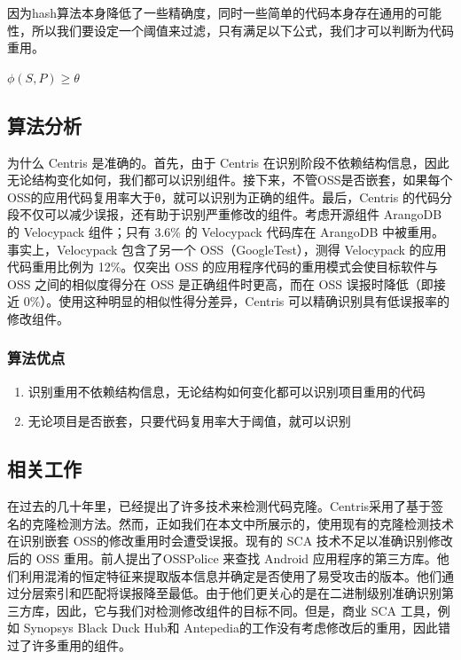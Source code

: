 \documentclass{cjc}
\begin{document}
因为hash算法本身降低了一些精确度，同时一些简单的代码本身存在通用的可能性，所以我们要设定一个阈值来过滤，只有满足以下公式，我们才可以判断为代码重用。



$\phi(S, P) \geq \theta$



\subsection{算法分析}
为什么 Centris 是准确的。首先，由于 Centris 在识别阶段不依赖结构信息，因此无论结构变化如何，我们都可以识别组件。接下来，不管OSS是否嵌套，如果每个OSS的应用代码复用率大于θ，就可以识别为正确的组件。最后，Centris 的代码分段不仅可以减少误报，还有助于识别严重修改的组件。考虑开源组件 ArangoDB 的 Velocypack 组件；只有 3.6\% 的 Velocypack 代码库在 ArangoDB 中被重用。事实上，Velocypack 包含了另一个 OSS（GoogleTest），测得 Velocypack 的应用代码重用比例为 12\%。仅突出 OSS 的应用程序代码的重用模式会使目标软件与 OSS 之间的相似度得分在 OSS 是正确组件时更高，而在 OSS 误报时降低（即接近 0\%）。使用这种明显的相似性得分差异，Centris 可以精确识别具有低误报率的修改组件。
\\
\subsubsection{算法优点}

\begin{enumerate}
    \item 识别重用不依赖结构信息，无论结构如何变化都可以识别项目重用的代码
    \item 无论项目是否嵌套，只要代码复用率大于阈值，就可以识别
\end{enumerate}

\subsection{相关工作}
在过去的几十年里，已经提出了许多技术来检测代码克隆。Centris采用了基于签名的克隆检测方法。然而，正如我们在本文中所展示的，使用现有的克隆检测技术在识别嵌套 OSS的修改重用时会遭受误报。现有的 SCA 技术不足以准确识别修改后的 OSS 重用。前人提出了OSSPolice 来查找 Android 应用程序的第三方库。他们利用混淆的恒定特征来提取版本信息并确定是否使用了易受攻击的版本。他们通过分层索引和匹配将误报降至最低。由于他们更关心的是在二进制级别准确识别第三方库，因此，它与我们对检测修改组件的目标不同。但是，商业 SCA 工具，例如 Synopsys Black Duck Hub和 Antepedia的工作没有考虑修改后的重用，因此错过了许多重用的组件。
\end{document}
